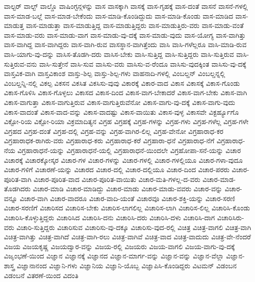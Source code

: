 {ವಾಲ್ಟರ್
ವಾಲ್ಟ್
ವಾಲ್ಡೊ
ವಾಷಿಂಗ್ಟನ್ಗಳನ್ನು
ವಾಸ
ವಾಸಕ್ಕಾಗಿ
ವಾಸಕ್ಕೆ
ವಾಸ-ಗೃಹಕ್ಕೆ
ವಾಸ-ದಂತೆ
ವಾಸನೆ
ವಾಸನೆ-ಗಳಲ್ಲಿ
ವಾಸ-ಮಾಡ-ಬಲ್ಲೆ
ವಾಸ-ಮಾಡ-ಬೇಕೆಂದು
ವಾಸ-ಮಾಡಿ-ಕೊಂಡಿದ್ದುದು
ವಾಸ-ಮಾಡಿ-ಕೊಂಡು
ವಾಸ-ಮಾಡಿದ
ವಾಸ-ಮಾಡುತ್ತ
ವಾಸ-ಮಾಡುತ್ತಾ
ವಾಸ-ಮಾಡುತ್ತಿದ್ದ
ವಾಸ-ಮಾಡುತ್ತಿದ್ದರು
ವಾಸ-ಮಾಡುತ್ತಿರು-ವರು
ವಾಸ-ಮಾಡು-ವಂತೆ
ವಾಸ-ಮಾಡು-ವರು
ವಾಸ-ಮಾಡು-ವಾಗ
ವಾಸ-ಮಾಡು-ವು-ದಕ್ಕೆ
ವಾಸ-ಮಾಡು-ವುದು
ವಾಸ-ಯೋಗ್ಯ
ವಾಸ-ವಾಗಿತ್ತು
ವಾಸ-ವಾಗಿದ್ದ
ವಾಸ-ವಾಗಿದ್ದರು
ವಾಸ-ವಾಗಿ-ರುವ
ವಾಸಸ್ಥಾನ-ವಾಗಿತ್ತೆಂದು
ವಾಸಿ
ವಾಸಿ-ಗಳೆಲ್ಲರೂ
ವಾಸಿ-ಮಾಡಿ-ರುವ
ವಾಸಿ-ಯಾಗು-ವು-ದನ್ನು
ವಾಸಿಸ-ತೊಡಗಿ-ದರು
ವಾಸಿಸ-ಬೇಕು
ವಾಸಿ-ಸುತ್ತಿದ್ದ
ವಾಸಿ-ಸುತ್ತಿದ್ದರು
ವಾಸಿ-ಸುತ್ತಿರುವ
ವಾಸಿ-ಸುತ್ತಿರುವ-ವನು
ವಾಸಿ-ಸುತ್ತೇನೆ
ವಾಸಿ-ಸುವ
ವಾಸಿಸು-ವರು
ವಾಸಿಸು-ವ-ರೆಂದೂ
ವಾಸಿಸು-ವುದಕ್ಕಿಂತ
ವಾಸಿಸು-ವು-ದಕ್ಕೆ
ವಾಸ್ತವಿಕ-ವಾಗಿ
ವಾಸ್ತವಿಕಾಂಶ
ವಾಸ್ತು-ಶಿಲ್ಪ
ವಾಸ್ತು-ಶಿಲ್ಪ-ಗಳು
ವಾಹನಾದಿ-ಗಳಲ್ಲಿ
ವಿಂಬಲ್ಡನ್
ವಿಂಬಲ್ಡನ್ನಲ್ಲಿ
ವಿಂಬಲ್ಡನ್ನಿ-ನಲ್ಲಿ
ವಿಕಲ್ಪ
ವಿಕಸನ
ವಿಕಸಿತ
ವಿಕಸಿಸು-ವುವು
ವಿಕಾರಕ್ಕೆ
ವಿಕಾರ-ವಾದ
ವಿಕಾಸ
ವಿಕಾಸಕ್ಕೆ
ವಿಕಾಸ-ಗೊಂಡು
ವಿಕಾಸ-ಗೊಳಿಸಿ
ವಿಕಾಸ-ಗೊಳ್ಳಲು
ವಿಕಾಸದ
ವಿಕಾಸ-ದಿಂದ
ವಿಕಾಸ-ವಾಗ-ಬೇಕಾದರೆ
ವಿಕಾಸ-ವಾಗ-ಬೇಕು
ವಿಕಾಸ-ವಾಗಿ
ವಿಕಾಸ-ವಾಗುತ್ತಾ
ವಿಕಾಸ-ವಾಗುತ್ತಿರುವ
ವಿಕಾಸ-ವಾಗುತ್ತಿರುವೆನೋ
ವಿಕಾಸ-ವಾಗು-ವು-ದಕ್ಕೆ
ವಿಕಾಸ-ವಾಗು-ವುದು
ವಿಕಾಸ-ವಾದಂತೆ
ವಿಕಾಸ-ವಾದ-ವನ್ನು
ವಿಕಾಸ-ವಾದಷ್ಟು
ವಿಕಾಸ-ವಾಯಿತು
ವಿಕಾಸ-ವುಳ್ಳ
ವಿಕಾಸವೇ
ವಿಕ್ಟರ್ಹ್ಯೂಗೊ
ವಿಕ್ಟೋ-ರಿಯ
ವಿಕ್ಟೋ-ರಿಯಾ
ವಿಕ್ರಮಾದಿತ್ಯನ
ವಿಗ್ರಹ
ವಿಗ್ರಹಕ್ಕೆ
ವಿಗ್ರಹ-ಗಳನ್ನು
ವಿಗ್ರಹ-ಗಳು
ವಿಗ್ರಹ-ಗಳೆಲ್ಲ
ವಿಗ್ರಹ-ಗಳೇ
ವಿಗ್ರಹದ
ವಿಗ್ರಹ-ದಂತೆ
ವಿಗ್ರಹ-ದಲ್ಲಿ
ವಿಗ್ರಹ-ವನ್ನು
ವಿಗ್ರಹ-ವಾಗಿರ-ಲಿಲ್ಲ
ವಿಗ್ರಹ-ವೇನೋ
ವಿಗ್ರಹಾರಾಧ-ಕರ
ವಿಗ್ರಹಾರಾಧಕ-ರಾಗಿರು-ವರು
ವಿಗ್ರಹಾರಾಧ-ಕರು
ವಿಗ್ರಹಾರಾಧ-ಕರೆ
ವಿಗ್ರಹಾರಾ-ಧನೆ
ವಿಗ್ರಹಾರಾಧ-ನೆಗೆ
ವಿಗ್ರಹಾರಾಧ-ನೆಯ
ವಿಗ್ರಹಾರಾಧನೆ-ಯನ್ನು
ವಿಗ್ರಹಾರಾಧನೆ-ಯಲ್ಲಿ
ವಿಗ್ರಹಾರಾಧನೆ-ಯಿಂದಲೇ
ವಿಗ್ರಹೋಪಾ-ಸನೆ-ಯನ್ನು
ವಿಚಾರ
ವಿಚಾರಕ್ಕೆ
ವಿಚಾರಕ್ಕೋಸ್ಕರ
ವಿಚಾರ-ಗಳ
ವಿಚಾರ-ಗಳನ್ನು
ವಿಚಾರ-ಗಳಲ್ಲಿ
ವಿಚಾರ-ಗಳಲ್ಲಿಯೂ
ವಿಚಾರ-ಗಳಾ-ವುದೂ
ವಿಚಾರ-ಗಳಿಗೆ
ವಿಚಾರಣೆ-ಯನ್ನು
ವಿಚಾರದ
ವಿಚಾರ-ದಲ್ಲಿ
ವಿಚಾರ-ದಲ್ಲಿಯೂ
ವಿಚಾರ-ದಿಂದ
ವಿಚಾರ-ಪರರು
ವಿಚಾರ-ಪೂರಿತ-ವಾಗಿ
ವಿಚಾರ-ಪೂರಿತ-ವಾದ
ವಿಚಾರ-ಪೂರಿತ-ವಾಯಿತು
ವಿಚಾರ-ಮತಿ-ಗಳಲ್ಲ-ದ-ವರು
ವಿಚಾರ-ಮಾಡ-ತೊಡಗಿದರು
ವಿಚಾರ-ಮಾಡಿ
ವಿಚಾರ-ಮಾಡಿದ್ದು
ವಿಚಾರ-ಮಾಡು
ವಿಚಾರ-ಮಾಡು-ವವರು
ವಿಚಾರ-ವನ್ನು
ವಿಚಾರ-ವನ್ನೂ
ವಿಚಾರ-ವಾಗಿ
ವಿಚಾರ-ವಾದರೂ
ವಿಚಾರ-ವಾದಿ-ಯಂತೆ
ವಿಚಾರವೂ
ವಿಚಾರ-ಶಕ್ತಿ-ಯನ್ನು
ವಿಚಾರ-ಸರಣಿ
ವಿಚಾರ-ಸರಣಿಗೆ
ವಿಚಾರಿಸದ
ವಿಚಾರಿಸ-ಬೇಕು
ವಿಚಾರಿಸ-ಲಾಗಲಿಲ್ಲ
ವಿಚಾರಿಸ-ಲಾಗಿ
ವಿಚಾರಿಸ-ಲಿಲ್ಲ
ವಿಚಾರಿಸಿ-ಕೊಂಡು
ವಿಚಾರಿಸಿ-ಕೊಳ್ಳುತ್ತಿದ್ದರು
ವಿಚಾರಿಸಿದ
ವಿಚಾರಿಸಿ-ದನು
ವಿಚಾರಿಸಿ-ದರು
ವಿಚಾರಿಸಿ-ದಳು
ವಿಚಾರಿಸಿ-ದಾಗ
ವಿಚಾರಿಸಿರು-ವರು
ವಿಚಾರಿ-ಸುತ್ತಿದ್ದರು
ವಿಚಾರಿಸುವ
ವಿಚಾರಿಸು-ವು-ದಕ್ಕೂ
ವಿಚಾರಿಸು-ವುದ-ರಲ್ಲಿ
ವಿಚಿತ್ರ
ವಿಚಿತ್ರ-ವಾಗಲಿ
ವಿಚಿತ್ರ-ವಾಗಿ
ವಿಚಿತ್ರ-ವಾಗಿತ್ತು
ವಿಚಿತ್ರ-ವಾಗಿದೆ
ವಿಚಿತ್ರ-ವಾಗಿ-ರಲು
ವಿಚಿತ್ರ-ವಾಗಿವೆ
ವಿಚಿತ್ರ-ವಾದ
ವಿಚಿತ್ರ-ವಾದುದು
ವಿಚಿತ್ರ-ವೇ-ನೆಂದರೆ
ವಿಜಯ
ವಿಜಯಕೃಷ್ಣ
ವಿಜಯದ್ವಾರ-ವನ್ನು
ವಿಜಯ-ರಲ್ಲಿ
ವಿಜಯರು
ವಿಜಯ-ವಾಗಲಿ
ವಿಜಯ-ವಾಗು-ವು-ದಕ್ಕೆ
ವಿಜೃಂಭಣೆ-ಯಿಂದ
ವಿಜ್ಞಾನ
ವಿಜ್ಞಾನಕ್ಕೆ
ವಿಜ್ಞಾನದ
ವಿಜ್ಞಾನ-ಮಾರ್ಗ-ವನ್ನು
ವಿಜ್ಞಾನ-ವನ್ನು
ವಿಜ್ಞಾನ-ವೆಲ್ಲಾ
ವಿಜ್ಞಾನ-ಶಾಸ್ತ್ರ
ವಿಜ್ಞಾನಾನಂದ
ವಿಜ್ಞಾನಿ-ಗಳು
ವಿಜ್ಞಾನಿಯ
ವಿಜ್ಞಾನಿ-ಯೊಬ್ಬ
ವಿಜ್ಞಾಪಿಸಿ-ಕೊಂಡಿದ್ದರು
ವಿಟಮನ್
ವಿಡಂಬನ
ವಿಡಂಬನೆ
ವಿತರಣೆ-ಯಿಂದ
ವಿದಂತಿ
}
